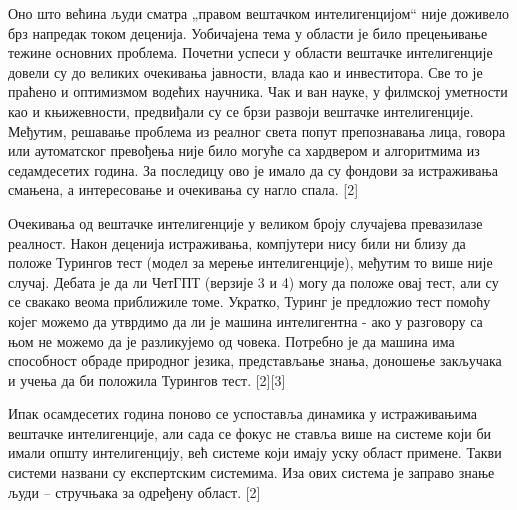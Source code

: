 Оно што већина људи сматра „правом вештачком интелигенцијом“ није доживело брз напредак током деценија. Уобичајена тема у области је било прецењивање тежине основних проблема. Почетни успеси у области вештачке интелигенције довели су до великих очекивања јавности, влада као и инвеститора. Све то је праћено и оптимизмом водећих научника. Чак и ван науке, у филмској уметности као и књижевности, предвиђали су се брзи развоји вештачке интелигенције. Међутим, решавање проблема из реалног света попут препознавања лица, говора или аутоматског превођења није било могуће са хардвером и алгоритмима из седамдесетих година. За последицу ово је имало да су фондови за истраживања смањена, а интересовање и очекивања су нагло спала. [2]

Очекивања од вештачке интелигенције у великом броју случајева превазилазе реалност. Након деценија истраживања, компјутери нису били ни близу да положе Турингов тест (модел за мерење интелигенције), међутим то више није случај. Дебата је да ли ЧетГПТ (верзије 3 и 4) могу да положе овај тест, али су се свакако веома приближиле томе. Укратко, Туринг је предложио тест помоћу којег можемо да утврдимо да ли је машина интелигентна - ако у разговору са њом не можемо да је разликујемо од човека. Потребно је да машина има способност обраде природног језика, представљање знања, доношење закључака и учења да би положила Турингов тест. [2][3]

Ипак осамдесетих година поново се успоставља динамика у истраживањима вештачке интелигенције, али сада се фокус не ставља више на системе који би имали општу интелигенцију, већ системе који имају уску област примене. Такви системи названи су експертским системима. Иза ових система је заправо знање људи – стручњака за одређену област. [2]